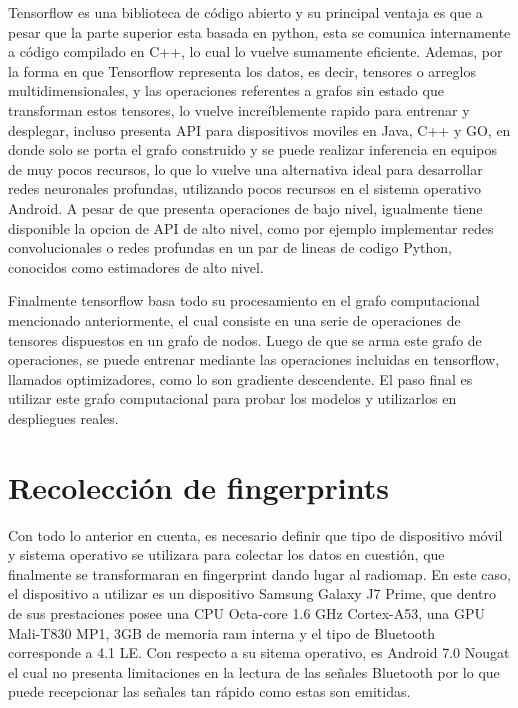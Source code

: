 Tensorflow es una biblioteca de código abierto y su principal ventaja es que a pesar que la parte superior esta basada en python, esta se comunica internamente a código compilado en C++, lo cual lo vuelve sumamente eficiente. Ademas, por la forma en que Tensorflow representa los datos, es decir, tensores o arreglos multidimensionales, y las operaciones referentes a grafos sin estado que transforman estos tensores, lo vuelve increíblemente rapido para entrenar y desplegar, incluso presenta API para dispositivos moviles en Java, C++ y GO, en donde solo se porta el grafo construido y se puede realizar inferencia en equipos de muy pocos recursos, lo que lo vuelve una alternativa ideal para desarrollar redes neuronales profundas, utilizando  pocos recursos en el sistema operativo Android. A pesar de que presenta operaciones de bajo nivel, igualmente tiene disponible la opcion de API de alto nivel, como por ejemplo implementar redes convolucionales o redes profundas en un par de lineas de codigo Python, conocidos como estimadores de alto nivel.

Finalmente tensorflow basa todo su procesamiento en el grafo computacional mencionado anteriormente, el cual consiste en una serie de operaciones de tensores dispuestos en un grafo de nodos. Luego de que se arma este grafo de operaciones, se puede entrenar mediante las operaciones incluidas en tensorflow, llamados optimizadores, como lo son gradiente descendente. El paso final es utilizar este grafo computacional para probar los modelos y utilizarlos en despliegues reales.


\section{Recolección de fingerprints}


Con todo lo anterior en cuenta, es necesario definir que tipo de dispositivo móvil y sistema operativo se utilizara para colectar los datos en cuestión, que finalmente se transformaran en fingerprint dando lugar al radiomap. En este caso, el dispositivo a utilizar es un dispositivo Samsung Galaxy J7 Prime, que dentro de sus prestaciones posee una CPU Octa-core 1.6 GHz Cortex-A53, una GPU Mali-T830 MP1, 3GB de memoria ram interna y el tipo de Bluetooth corresponde a 4.1 LE. Con respecto a su sitema operativo, es Android 7.0 Nougat el cual no presenta limitaciones en la lectura de las señales Bluetooth por lo que puede recepcionar las señales tan rápido como estas son emitidas.

